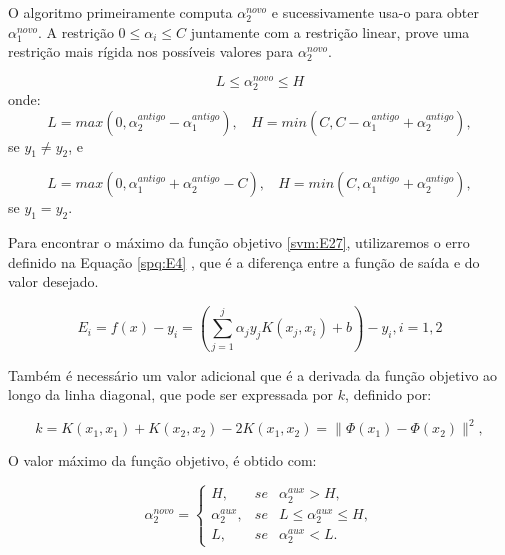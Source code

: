 O algoritmo primeiramente computa $\alpha_{2}^{novo}$ e sucessivamente usa-o para obter $\alpha_{1}^{novo}$. A restrição $0 \leq \alpha_{i} \leq C$ juntamente com a restrição linear, prove uma restrição mais rígida nos possíveis valores para $\alpha_{2}^{novo}$.

\begin{equation}\label{spq:E1}
L \leq \alpha_{2}^{novo} \leq H
\end{equation}
onde:
\begin{equation}\label{spq:E2}
L = max(0, \alpha_{2}^{antigo} - \alpha_{1}^{antigo}),\ \ \ \ H = min(C, C - \alpha_{1}^{antigo} + \alpha_{2}^{antigo}),
\end{equation}
se $y_{1} \neq y_{2}$, e

\begin{equation}\label{spq:E3}
L = max(0, \alpha_{1}^{antigo} + \alpha_{2}^{antigo} - C),\ \ \ \ H = min(C, \alpha_{1}^{antigo} + \alpha_{2}^{antigo}),
\end{equation}
se $y_{1} = y_{2}$.

Para encontrar o máximo da função objetivo \ref{svm:E27}, utilizaremos o erro definido na Equação \ref{spq:E4} , que é a diferença entre a função de saída e do valor desejado.

\begin{equation}\label{spq:E4}
E_{i} = f(x) - y_{i} = \left(\sum_{j=1}^{j} \alpha_{j}y_{j}K(x_{j},x_{i}) + b \right) - y_{i},i=1,2
\end{equation}

Também é necessário um valor adicional que é a derivada da função objetivo ao longo da linha diagonal, que pode ser expressada por $k$, definido por:

\begin{equation}\label{spq:E5}
k = K(x_{1},x_{1})+K(x_{2},x_{2}) - 2K(x_{1},x_{2}) = \parallel \Phi(x_{1}) - \Phi(x_{2}) \parallel^2,
\end{equation}

O valor máximo da função objetivo, é obtido com:

\begin{equation}
\alpha_{2}^{novo} = 
\left\{\begin{matrix}
H, & se & \alpha_{2}^{aux} > H, \\ 
\alpha_{2}^{aux}, & se & L \leq \alpha_{2}^{aux} \leq H, \\
L, & se & \alpha_{2}^{aux} < L.
\end{matrix}\right.
\end{equation}

